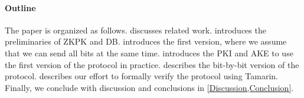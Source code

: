 \paragraph*{Outline}

The paper is organized as follows.
 discusses related work.
 introduces the preliminaries of \ac{ZKPK} and \ac{DB}.
 introduces the first version, where we assume that we can 
send all bits at the same time.
 introduces the \ac{PKI} and \ac{AKE} to use the first 
version of the protocol in practice.
 describes the bit-by-bit version of the protocol.
 describes our effort to formally verify the protocol 
using Tamarin.
Finally, we conclude with discussion and conclusions in 
\cref{Discussion,Conclusion}.

